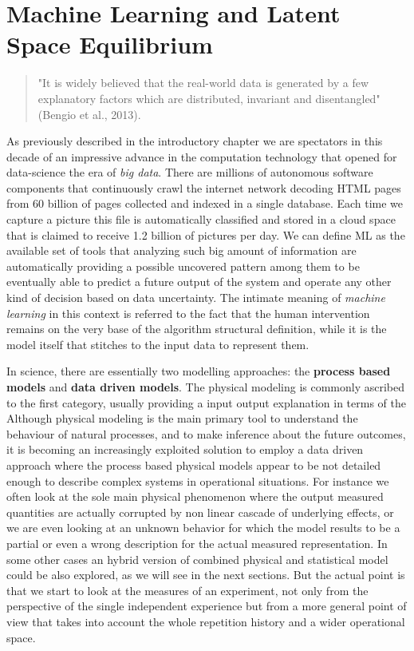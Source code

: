 \chapter{Machine Learning and Latent Space Equilibrium}
%
\begin{quote}
"It is widely believed that the real-world data is generated by a few explanatory factors which are distributed, invariant and disentangled" (Bengio et al., 2013).
\end{quote}
%
As previously described in the introductory chapter we are spectators in this decade of an impressive advance in the computation technology that opened for data-science the era of \textit{big data}. There are millions of autonomous software components that continuously crawl the internet network decoding HTML pages from 60 billion of pages collected and indexed in a single database. Each time we capture a picture this file is automatically classified and stored in a cloud space that is claimed to receive 1.2 billion of pictures per day. 
%
We can define \ac{ML} as the available set of tools that analyzing such big amount of information are automatically providing a possible uncovered pattern among them to be eventually able to predict a future output of the system and operate any other kind of decision based on data uncertainty. The intimate meaning of \textit{machine learning} in this context is referred to the fact that the human intervention remains on the very base of the algorithm structural definition, while it is the model itself that stitches to the input data to represent them.

In science, there are essentially two modelling approaches: the \textbf{process based models} and \textbf{data driven models}.
The physical modeling is commonly ascribed to the first category, usually providing a input output explanation in terms of the
Although physical modeling is the main primary tool to understand the behaviour of natural processes, and to make inference about the future outcomes, it is becoming an increasingly exploited solution to employ a data driven approach where the process based physical models appear to be not detailed enough to describe complex systems in operational situations. For instance we often look at the sole main physical phenomenon where the output measured quantities are actually corrupted by non linear cascade of underlying effects, or we are even looking at an unknown behavior for which the model results to be a partial or even a wrong description for the actual measured representation. 
In some other cases an hybrid version of combined physical and statistical model could be also explored, as we will see in the next sections. But the actual point is that we start to look at the measures of an experiment, not only from the perspective of the single independent experience but from a more general point of view that takes into account the whole repetition history and a wider operational space.  


